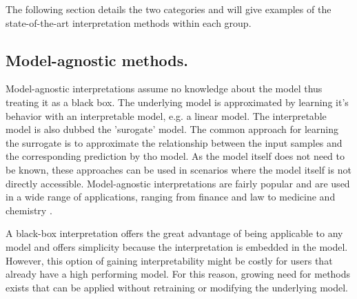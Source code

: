 The following section details the two categories and will give examples of the state-of-the-art interpretation methods within each group. 





\subsection{Model-agnostic methods.}
\label{subsec:bb_methods}

Model-agnostic interpretations assume no knowledge about the model thus treating it as a black box. The underlying model is approximated by learning it's behavior with an interpretable model, e.g. a linear model. The interpretable model is also dubbed the 'surogate' model. The common approach for learning the surrogate is to approximate the relationship between the input samples and the corresponding prediction by tho model.
As the model itself does not need to be known, these approaches can be used in scenarios where the model itself is not directly accessible. Model-agnostic interpretations are fairly popular and are used in a wide range of applications, ranging from finance and law to medicine and chemistry \cite{elshawi2019interpretability, whitmore2016mapping}. 

A black-box interpretation offers the great advantage of being applicable to any model and offers simplicity because the interpretation is embedded in the model. However, this option of gaining interpretability might be costly for users that already have a high performing model. For this reason, growing need for methods exists that can be applied without retraining or modifying the underlying model.

